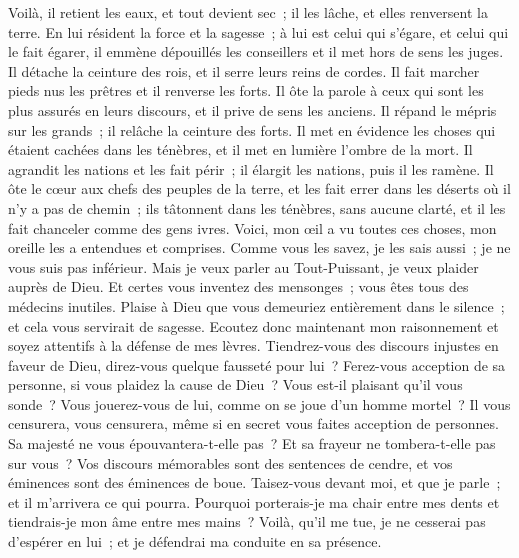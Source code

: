\begin{multicols}{2}
Voilà, il retient les eaux, et tout devient sec~; il les lâche, et elles renversent la terre.
En lui résident la force et la sagesse~; à lui est celui qui s'égare, et celui qui le fait égarer,
il emmène dépouillés les conseillers et il met hors de sens les juges.
Il détache la ceinture des rois, et il serre leurs reins de cordes.
Il fait marcher pieds nus les prêtres et il renverse les forts.
Il ôte la parole à ceux qui sont les plus assurés en leurs discours, et il prive de sens les anciens.
Il répand le mépris sur les grands~; il relâche la ceinture des forts.
Il met en évidence les choses qui étaient cachées dans les ténèbres, et il met en lumière l'ombre de la mort.
 Il agrandit les nations et les fait périr~; il élargit les nations, puis il les ramène. 
Il ôte le cœur aux chefs des peuples de la terre, et les fait errer dans les déserts où il n'y a pas de chemin~;
ils tâtonnent dans les ténèbres, sans aucune clarté, et il les fait chanceler comme des gens ivres. 
\VerseOne{}Voici, mon œil a vu toutes ces choses, mon oreille les a entendues et comprises.
Comme vous les savez, je les sais aussi~; je ne vous suis pas inférieur. 
Mais je veux parler au Tout-Puissant, je veux plaider auprès de Dieu.
Et certes vous inventez des mensonges~; vous êtes tous des médecins inutiles.
Plaise à Dieu que vous demeuriez entièrement dans le silence~; et cela vous servirait de sagesse.
Ecoutez donc maintenant mon raisonnement et soyez attentifs à la défense de mes lèvres.
Tiendrez-vous des discours injustes en faveur de Dieu, direz-vous quelque fausseté pour lui~? 
Ferez-vous acception de sa personne, si vous plaidez la cause de Dieu~? 
Vous est-il plaisant qu'il vous sonde~? Vous jouerez-vous de lui, comme on se joue d'un homme mortel~? 
Il vous censurera, vous censurera, même si en secret vous faites acception de personnes.
Sa majesté ne vous épouvantera-t-elle pas~? Et sa frayeur ne tombera-t-elle pas sur vous~? 
Vos discours mémorables sont des sentences de cendre, et vos éminences sont des éminences de boue. 
Taisez-vous devant moi, et que je parle~; et il m'arrivera ce qui pourra. 
Pourquoi porterais-je ma chair entre mes dents et tiendrais-je mon âme entre mes mains~?
Voilà, qu'il me tue, je ne cesserai pas d'espérer en lui~; et je défendrai ma conduite en sa présence.

\end{multicols}
